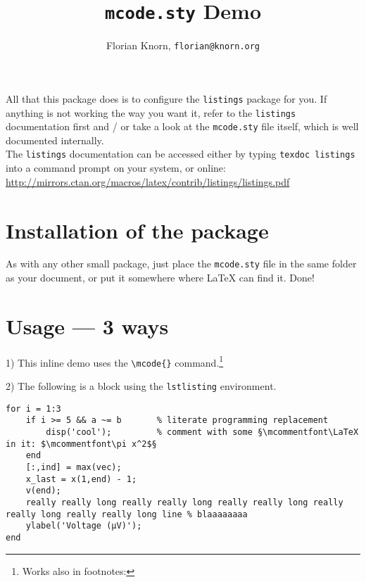 \documentclass{article}
\title{\texttt{mcode.sty} Demo}
\author{Florian Knorn, \texttt{florian@knorn.org}}
\begin{document}
\maketitle

\begin{center}
\begin{minipage}{.75\linewidth}

	All that this package does is to configure the \verb|listings| package for you. If anything is not working the way you want it, refer to the \verb|listings| documentation first and / or take a look at the \verb|mcode.sty| file itself, which is well documented internally.\\
	
	The \verb|listings| documentation can be accessed either by typing \verb|texdoc listings| into a command prompt on your system, or online:\\\scriptsize\url{http://mirrors.ctan.org/macros/latex/contrib/listings/listings.pdf}
	
\end{minipage}
\end{center}

\section*{Installation of the package}

As with any other small package, just place the \verb|mcode.sty| file in the same folder as your document, or put it somewhere where \LaTeX{} can find it.  Done!

\medskip

\section*{Usage --- 3 ways}

1) This inline demo  uses the \verb|\mcode{}| command.\footnote{Works also in footnotes: }

2) The following is a block using the \verb|lstlisting| environment.
\begin{lstlisting}[captionpos=b, caption=Das ist ein Matlabtext, label=Matlab]
for i = 1:3
	if i >= 5 && a ~= b       % literate programming replacement
		disp('cool');         % comment with some §\mcommentfont\LaTeX in it: $\mcommentfont\pi x^2$§
	end
	[:,ind] = max(vec);
	x_last = x(1,end) - 1;
	v(end);
	really really long really really long really really long really really long really really long line % blaaaaaaaa
	ylabel('Voltage (µV)');
end
\end{lstlisting}
\end{document}
